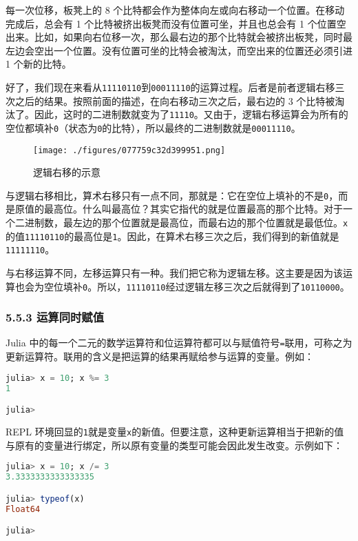 每一次位移，板凳上的 8 个比特都会作为整体向左或向右移动一个位置。在移动完成后，总会有 1 个比特被挤出板凳而没有位置可坐，并且也总会有 1 个位置空出来。比如，如果向右位移一次，那么最右边的那个比特就会被挤出板凳，同时最左边会空出一个位置。没有位置可坐的比特会被淘汰，而空出来的位置还必须引进 1 个新的比特。

好了，我们现在来看从\verb`11110110`到\verb`00011110`的运算过程。后者是前者逻辑右移三次之后的结果。按照前面的描述，在向右移动三次之后，最右边的 3 个比特被淘汰了。因此，这时的二进制数就变为了\verb`11110`。又由于，逻辑右移运算会为所有的空位都填补\verb`0`（状态为\verb`0`的比特），所以最终的二进制数就是\verb`00011110`。
\begin{figure}[ht]
\centering
\texttt{[image: ./figures/077759c32d399951.png]}
\caption{逻辑右移的示意} \label{fig_JuC5S5_1}
\end{figure}

与逻辑右移相比，算术右移只有一点不同，那就是：它在空位上填补的不是\verb`0`，而是原值的最高位。什么叫最高位？其实它指代的就是位置最高的那个比特。对于一个二进制数，最左边的那个位置就是最高位，而最右边的那个位置就是最低位。\verb`x`的值\verb`11110110`的最高位是\verb`1`。因此，在算术右移三次之后，我们得到的新值就是\verb`11111110`。

与右移运算不同，左移运算只有一种。我们把它称为逻辑左移。这主要是因为该运算也会为空位填补\verb`0`。所以，\verb`11110110`经过逻辑左移三次之后就得到了\verb`10110000`。

\subsubsection{5.5.3 运算同时赋值}

Julia 中的每一个二元的数学运算符和位运算符都可以与赋值符号\verb`=`联用，可称之为更新运算符。联用的含义是把运算的结果再赋给参与运算的变量。例如：
\begin{lstlisting}[language=julia]
julia> x = 10; x %= 3
1

julia>
\end{lstlisting}

REPL 环境回显的\verb`1`就是变量\verb`x`的新值。但要注意，这种更新运算相当于把新的值与原有的变量进行绑定，所以原有变量的类型可能会因此发生改变。示例如下：
\begin{lstlisting}[language=julia]
julia> x = 10; x /= 3
3.3333333333333335

julia> typeof(x)
Float64

julia> 
\end{lstlisting}

